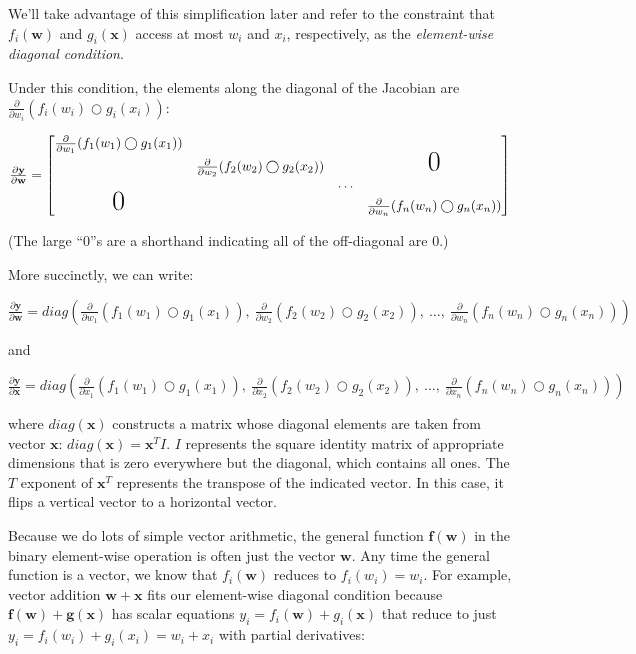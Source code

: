 \documentclass[11pt]{article}
\begin{document}
We'll take advantage of this simplification later and refer to the constraint that $f_i(\mathbf{w})$ and $g_i(\mathbf{x})$ access at most $w_i$ and $x_i$, respectively, as the {\em element-wise diagonal condition}.

Under this condition, the elements along the diagonal of the Jacobian are $\frac{\partial}{\partial w_i} ( f_i(w_i) \bigcirc g_i(x_i) )$:

$
\frac{\partial \mathbf{y}}{\partial \mathbf{w}}  = \begin{bmatrix}
\frac{\partial}{\partial w_1} ( f_{1}(w_1) \bigcirc g_{1}(x_1) )\\
& \frac{\partial}{\partial w_2} (f_{2}(w_2) \bigcirc g_{2}(x_2) ) & &\text{\huge0}\\
& & \ldots \\
\text{\huge0}& & & \frac{\partial}{\partial w_n} (f_{n}(w_n) \bigcirc g_{n}(x_n) )
\end{bmatrix}
$

(The large ``0''s are a shorthand indicating all of the off-diagonal are 0.)

More succinctly, we can write:

$\frac{\partial \mathbf{y}}{\partial \mathbf{w}} = diag \left( \frac{\partial}{\partial w_1}(f_{1}(w_1) \bigcirc g_{1}(x_1)),~ \frac{\partial}{\partial w_2}(f_{2}(w_2) \bigcirc g_{2}(x_2)),~ \ldots,~ \frac{\partial}{\partial w_n}(f_{n}(w_n) \bigcirc g_{n}(x_n)) \right)$

and

$\frac{\partial \mathbf{y}}{\partial \mathbf{x}} = diag \left( \frac{\partial}{\partial x_1}(f_{1}(w_1) \bigcirc g_{1}(x_1)),~ \frac{\partial}{\partial x_2}(f_{2}(w_2) \bigcirc g_{2}(x_2)),~ \ldots,~ \frac{\partial}{\partial x_n}(f_{n}(w_n) \bigcirc g_{n}(x_n)) \right)$

where $diag(\mathbf{x})$ constructs a matrix whose diagonal elements are taken from vector $\mathbf{x}$: $diag(\mathbf{x}) = \mathbf{x}^T I$. $I$ represents the square identity matrix of appropriate dimensions that is zero everywhere but the diagonal, which contains all ones.  The $T$ exponent of $\mathbf{x}^T$ represents the transpose of the indicated vector. In this case, it flips a vertical vector to a horizontal vector.

Because we do lots of simple vector arithmetic, the general function $\mathbf{f(w)}$ in the binary element-wise operation is often just the vector $\mathbf{w}$.  Any time the general function is a vector, we know that $f_i(\mathbf{w})$ reduces to $f_i(w_i) = w_i$. For example, vector addition $\mathbf{w + x}$ fits our element-wise diagonal condition because $\mathbf{f(w)} + \mathbf{g(x)}$ has scalar equations $y_i = f_i(\mathbf{w}) + g_i(\mathbf{x})$ that reduce to just $y_i = f_i(w_i) + g_i(x_i) = w_i + x_i$ with partial derivatives:
\end{document}
